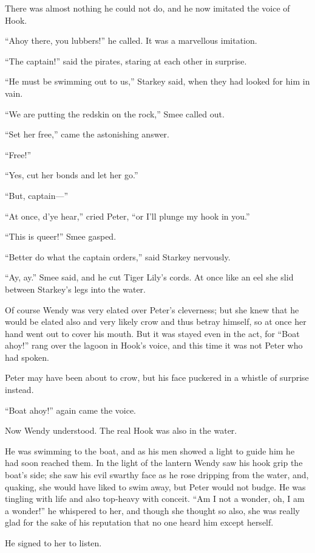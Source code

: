 There was almost nothing he could not do, and he now imitated the voice of Hook.

“Ahoy there, you lubbers!\@” he called.
It was a marvellous imitation.

“The captain!\@” said the pirates, staring at each other in surprise.

“He must be swimming out to us,” Starkey said, when they had looked for him in vain.

“We are putting the redskin on the rock,” Smee called out.

“Set her free,” came the astonishing answer.

“Free!”

“Yes, cut her bonds and let her go.”

“But, captain—”

“At once, d’ye hear,” cried Peter, “or I’ll plunge my hook in you.”

“This is queer!\@” Smee gasped.

“Better do what the captain orders,” said Starkey nervously.

“Ay, ay.”
Smee said, and he cut Tiger Lily’s cords.
At once like an eel she slid between Starkey’s legs into the water.

Of course Wendy was very elated over Peter’s cleverness;
but she knew that he would be elated also and very likely crow and thus betray himself,
so at once her hand went out to cover his mouth.
But it was stayed even in the act, for “Boat ahoy!\@” rang over the lagoon in Hook’s voice,
and this time it was not Peter who had spoken.

Peter may have been about to crow, but his face puckered in a whistle of surprise instead.

“Boat ahoy!\@” again came the voice.

Now Wendy understood.
The real Hook was also in the water.

He was swimming to the boat, and as his men showed a light to guide him he had soon reached them.
In the light of the lantern Wendy saw his hook grip the boat’s side;
she saw his evil swarthy face as he rose dripping from the water,
and, quaking, she would have liked to swim away, but Peter would not budge.
He was tingling with life and also top‐heavy with conceit.
“Am I not a wonder, oh, I am a wonder!\@” he whispered to her,
and though she thought so also,
she was really glad for the sake of his reputation that no one heard him except herself.

He signed to her to listen.

